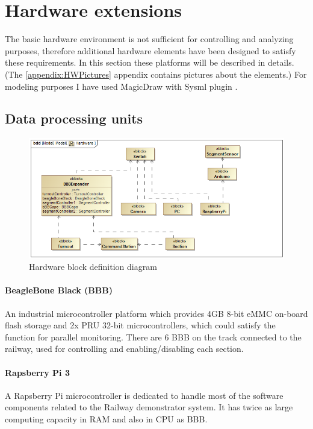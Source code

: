 \section{Hardware extensions}
The basic hardware environment is not sufficient for controlling and analyzing purposes, therefore additional hardware elements have been designed to satisfy these requirements. In this section these platforms will be described in details. (The \ref{appendix:HWPictures} appendix contains pictures about the elements.)
For modeling purposes I have used MagicDraw with Sysml plugin \cite{SysML}.

\subsection{Data processing units}
\begin{figure}[h]
	\centering
	\includegraphics[width=150mm]{figures/modes3/Hardware.png}
	\caption{Hardware block definition diagram}
	\label{fig:Modes3HWBDD}
\end{figure}

\paragraph{BeagleBone Black (BBB)}
An industrial microcontroller platform which provides 4GB 8-bit eMMC on-board flash storage and 2x PRU 32-bit microcontrollers, which could satisfy the function for parallel monitoring. There are 6 BBB on the track connected to the railway, used for controlling and enabling/disabling each section.

\paragraph{Rapsberry Pi 3}
A Rapsberry Pi microcontroller is dedicated to handle most of the software components related to the Railway demonstrator system. It has twice as large computing capacity in RAM and also in CPU as BBB.

